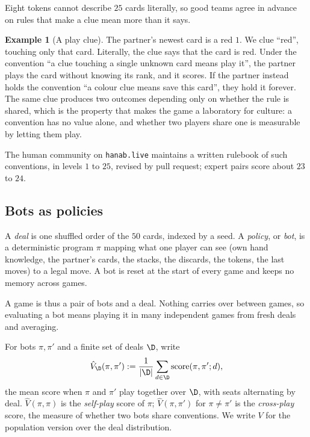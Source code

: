 \documentclass[11pt]{article}
\numberwithin{theorem}{section}
\theoremstyle{definition}
\newtheorem{example}[theorem]{Example}
\theoremstyle{problemstyle}
\begin{document}
Eight tokens cannot describe $25$ cards literally, so good teams agree in advance on rules that make a clue mean more
than it says.

\begin{example}[A play clue]
The partner's newest card is a red $1$. We clue ``red'', touching only that card. Literally, the clue says that the
card is red. Under the convention ``a clue touching a single unknown card means play it'', the partner plays the card
without knowing its rank, and it scores. If the partner instead holds the convention ``a colour clue means save this
card'', they hold it forever. The same clue produces two outcomes depending only on whether the rule is shared, which
is the property that makes the game a laboratory for culture: a convention has no value alone, and whether two players
share one is measurable by letting them play.
\end{example}

The human community on \texttt{hanab.live} maintains a written rulebook of such conventions, in levels $1$ to $25$,
revised by pull request; expert pairs score about $23$ to $24$.

\subsection{Bots as policies}

\begin{definition}
A \emph{deal} is one shuffled order of the $50$ cards, indexed by a seed. A \emph{policy}, or \emph{bot}, is a
deterministic program $\pi$ mapping what one player can see (own hand knowledge, the partner's cards, the stacks, the
discards, the tokens, the last moves) to a legal move. A bot is reset at the start of every game and keeps no memory
across games.
\end{definition}

A game is thus a pair of bots and a deal. Nothing carries over between games, so evaluating a bot means playing it in
many independent games from fresh deals and averaging.

\begin{definition}
For bots $\pi,\pi'$ and a finite set of deals $\D$, write
\[
\hat V_{\D}(\pi,\pi') := \frac{1}{|\D|}\sum_{d\in\D}\mathrm{score}(\pi,\pi';d),
\]
the mean score when $\pi$ and $\pi'$ play together over $\D$, with seats alternating by deal. $\hat V(\pi,\pi)$ is the
\emph{self-play} score of $\pi$; $\hat V(\pi,\pi')$ for $\pi\neq\pi'$ is the \emph{cross-play} score, the measure of
whether two bots share conventions. We write $V$ for the population version over the deal distribution.
\end{definition}
\end{document}

